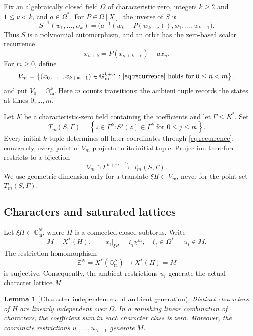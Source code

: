 \documentclass[11pt]{article}
\newcommand{\Gm}{\mathbb{G}_{\mathrm m}}
\newcommand{\Z}{\mathbb{Z}}
\newcommand{\Om}{\Omega}
\newtheorem{lemma}{Lemma}[section]
\theoremstyle{remark}
\numberwithin{equation}{section}
\begin{document}
Fix an algebraically closed field \(\Om\) of characteristic zero, integers \(k\geq2\) and \(1\leq\nu<k\), and \(a\in\Om^\ast\).  For \(P\in\Om[X]\), the inverse of \(S\) is
\[
 S^{-1}(w_1,\ldots,w_k)
 =
 \bigl(a^{-1}(w_k-P(w_{k-\nu})),w_1,\ldots,w_{k-1}\bigr).
\]
Thus \(S\) is a polynomial automorphism, and an orbit has the zero-based scalar recurrence
\begin{equation}\label{eq:recurrence}
 x_{n+k}=P(x_{n+k-\nu})+a x_n.
\end{equation}
For \(m\geq0\), define
\[
 V_m=\left\{(x_0,\ldots,x_{k+m-1})\in\Gm^{k+m}:
 \eqref{eq:recurrence}\ \text{holds for }0\leq n<m\right\},
\]
and put \(V_0=\Gm^k\).  Here \(m\) counts transitions: the ambient tuple records the states at times \(0,\ldots,m\).

Let \(K\) be a characteristic-zero field containing the coefficients and let \(\Gamma\leq K^\ast\).  Set
\[
 T_m(S,\Gamma)=
 \left\{z\in\Gamma^k:S^j(z)\in\Gamma^k\text{ for }0\leq j\leq m\right\}.
\]
Every initial \(k\)-tuple determines all later coordinates through \eqref{eq:recurrence}; conversely, every point of \(V_m\) projects to its initial tuple.  Projection therefore restricts to a bijection
\begin{equation}\label{eq:projection-bijection}
 V_m\cap\Gamma^{k+m}\ \xrightarrow{\;\sim\;}\ T_m(S,\Gamma).
\end{equation}
We use geometric dimension only for a translate \(\xi H\subset V_m\), never for the point set \(T_m(S,\Gamma)\).

\subsection{Characters and saturated lattices}

Let \(\xi H\subset\Gm^N\), where \(H\) is a connected closed subtorus.  Write
\[
 M=X^\ast(H),\qquad x_i|_{\xi H}=\xi_i\chi^{u_i},
 \quad \xi_i\in\Om^\ast,\quad u_i\in M.
\]
The restriction homomorphism
\begin{equation}\label{eq:ambient-surjection}
 \Z^N=X^\ast(\Gm^N)\longrightarrow X^\ast(H)=M
\end{equation}
is surjective.  Consequently, the ambient restrictions \(u_i\) generate the actual character lattice \(M\).

\begin{lemma}[Character independence and ambient generation]\label{lem:character-independence}
Distinct characters of \(H\) are linearly independent over \(\Om\).  In a vanishing linear combination of characters, the coefficient sum in each character class is zero.  Moreover, the coordinate restrictions \(u_0,\ldots,u_{N-1}\) generate \(M\).
\end{lemma}
\end{document}
